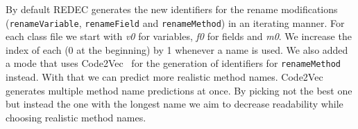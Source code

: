 \documentclass[%
class=scrreprt,
chapterprefix=false,%
open=right,%
twoside=false,%
paper=a4,%
logofile={Logo\_zentral\_farbig\_EN.png},%
thesistype=master,%
UKenglish,%
]{se2thesis}
\theoremstyle{definition}
\newcommand{\rdh}{REDEC\xspace}
\begin{document}
	By default \rdh generates the new identifiers for the rename modifications (\texttt{renameVariable}, \texttt{renameField} and \texttt{renameMethod}) in an iterating manner. For each class file we start with \textit{v0} for variables, \textit{f0} for fields and \textit{m0}. We increase the index of each (0 at the beginning) by 1 whenever a name is used.
	We also added a mode that uses Code2Vec~\cite{alon2019code2vec} for the generation of identifiers for \texttt{renameMethod} instead. With that we can predict more realistic method names. Code2Vec generates multiple method name predictions at once. By picking not the best one but instead the one with the longest name we aim to decrease readability while choosing realistic method names.
		
	
\end{document}
